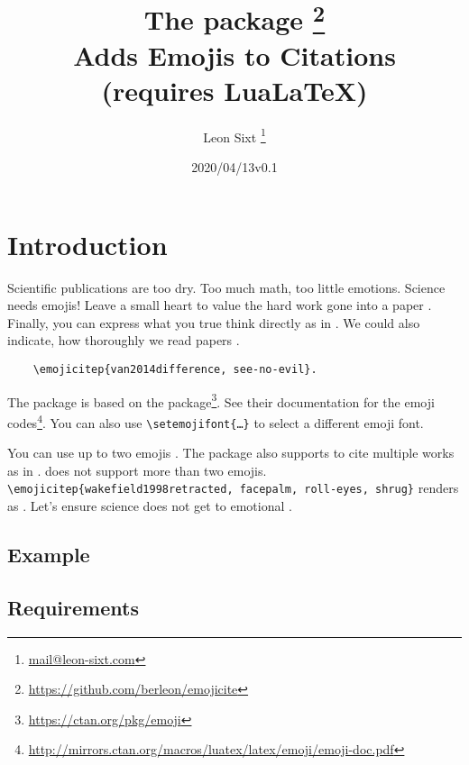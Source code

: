 \documentclass{l3doc}
\title{The \pkg{emojicite} package \thanks{\url{https://github.com/berleon/emojicite}} \\
  Adds Emojis to Citations \\
  \normalsize (requires Lua\LaTeX)}
\author{Leon Sixt \thanks{\url{mail@leon-sixt.com}}}
\date{\emoji{date} 2020/04/13\quad v0.1}
\begin{document}
\maketitle

\tableofcontents

\setlength{\parskip}{0.5em}

\section{Introduction}

Scientific publications are too dry. Too much math, too little emotions. Science
needs emojis!
Leave a small heart to value the hard work gone into a paper .
Finally, you can express what you true think directly as in .
We could also indicate, how thoroughly we read papers .

\begin{verbatim}
    \emojicitep{van2014difference, see-no-evil}.
\end{verbatim}


The package is based on the  package\footnote{\url{https://ctan.org/pkg/emoji}}.
See their documentation for the emoji codes\footnote{\url{http://mirrors.ctan.org/macros/luatex/latex/emoji/emoji-doc.pdf}}. You can also use \texttt{\textbackslash setemojifont\{\dots\}} to select a different emoji font.


You can use up to two emojis . The package also supports
to cite multiple works as in .
 does not support more than two emojis.
\texttt{\textbackslash emojicitep\{wakefield1998retracted, facepalm, roll-eyes, shrug\}}
renders as .
Let's ensure science does not get to emotional .

\newpage
\subsection{Example}


\subsection{Requirements}
\end{document}
